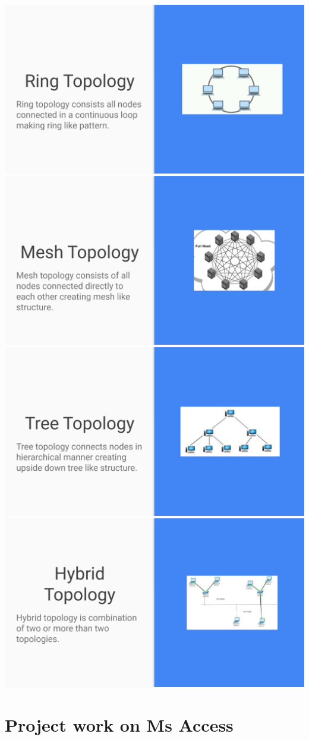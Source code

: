 \documentclass[17pt,a4paper,oneside,margin=1in]{article}
\begin{document}
\begin{center}
	\includegraphics[width=0.7\linewidth]{./scrot/network-4.png}
	\includegraphics[width=0.7\linewidth]{./scrot/network-5.png}
	\includegraphics[width=0.7\linewidth]{./scrot/network-6.png}
	\includegraphics[width=0.7\linewidth]{./scrot/network-7.png}
\end{center}


\section{Project work on Ms Access}
\end{document}
